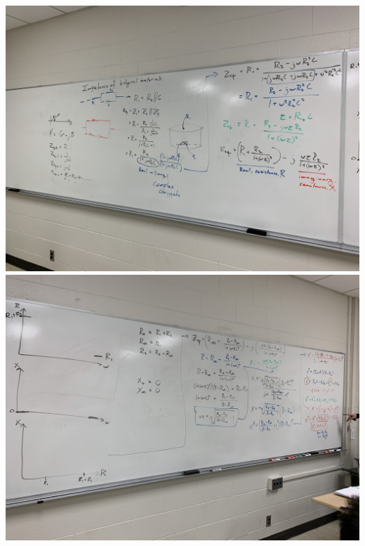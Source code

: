 \documentclass[11pt]{book}
\begin{document}
\includegraphics[width=\textwidth]{figures/4-2-19_Fig.1.jpg}
\\
\includegraphics[width=\textwidth]{figures/4-2-19_Fig.2.jpg}
\\
\end{document}
